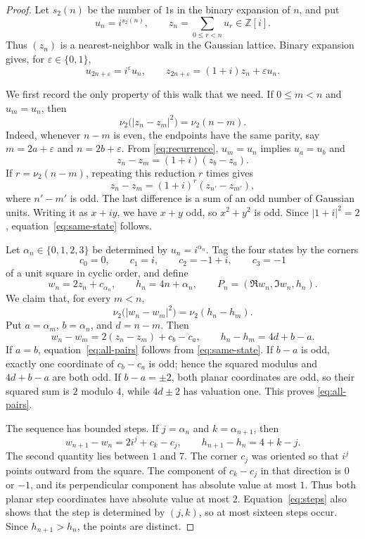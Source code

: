 \documentclass[10pt,a4paper]{amsart}
\newcommand{\Z}{\mathbb Z}
\newcommand{\vTwo}{\nu_2}
\begin{document}
\begin{proof}
Let $s_2(n)$ be the number of $1$s in the binary expansion of $n$, and put
\[
 u_n=i^{s_2(n)},\qquad z_n=\sum_{0\leq r<n}u_r\in\Z[i].
\]
Thus $(z_n)$ is a nearest-neighbor walk in the Gaussian lattice.  Binary
expansion gives, for $\varepsilon\in\{0,1\}$,
\begin{equation}\label{eq:recurrence}
 u_{2n+\varepsilon}=i^\varepsilon u_n,
 \qquad z_{2n+\varepsilon}=(1+i)z_n+\varepsilon u_n.
\end{equation}

We first record the only property of this walk that we need.  If $0\leq m<n$
and $u_m=u_n$, then
\begin{equation}\label{eq:same-state}
 \vTwo\bigl(|z_n-z_m|^2\bigr)=\vTwo(n-m).
\end{equation}
Indeed, whenever $n-m$ is even, the endpoints have the same parity, say
$m=2a+\varepsilon$ and $n=2b+\varepsilon$.  From
\eqref{eq:recurrence}, $u_m=u_n$ implies $u_a=u_b$ and
\[
 z_n-z_m=(1+i)(z_b-z_a).
\]
If $r=\vTwo(n-m)$, repeating this reduction $r$ times gives
\[
 z_n-z_m=(1+i)^r(z_{n'}-z_{m'}),
\]
where $n'-m'$ is odd.  The last difference is a sum of an odd number of
Gaussian units.  Writing it as $x+iy$, we have $x+y$ odd, so $x^2+y^2$ is
odd.  Since $|1+i|^2=2$, equation~\eqref{eq:same-state} follows.

Let $\alpha_n\in\{0,1,2,3\}$ be determined by $u_n=i^{\alpha_n}$.  Tag the
four states by the corners
\[
 c_0=0,\qquad c_1=i,\qquad c_2=-1+i,\qquad c_3=-1
\]
of a unit square in cyclic order, and define
\begin{equation}\label{eq:points}
 w_n=2z_n+c_{\alpha_n},\qquad
 h_n=4n+\alpha_n,\qquad
 P_n=(\Re w_n,\Im w_n,h_n).
\end{equation}
We claim that, for every $m<n$,
\begin{equation}\label{eq:all-pairs}
 \vTwo\bigl(|w_n-w_m|^2\bigr)=\vTwo(h_n-h_m).
\end{equation}
Put $a=\alpha_m$, $b=\alpha_n$, and $d=n-m$.  Then
\[
 w_n-w_m=2(z_n-z_m)+c_b-c_a,
 \qquad h_n-h_m=4d+b-a.
\]
If $a=b$, equation~\eqref{eq:all-pairs} follows from
\eqref{eq:same-state}.  If $b-a$ is odd, exactly one coordinate of
$c_b-c_a$ is odd; hence the squared modulus and $4d+b-a$ are both odd.  If
$b-a=\pm2$, both planar coordinates are odd, so their squared sum is $2$
modulo $4$, while $4d\pm2$ has valuation one.  This proves
\eqref{eq:all-pairs}.

The sequence has bounded steps.  If $j=\alpha_n$ and $k=\alpha_{n+1}$, then
\begin{equation}\label{eq:steps}
 w_{n+1}-w_n=2i^j+c_k-c_j,
 \qquad h_{n+1}-h_n=4+k-j.
\end{equation}
The second quantity lies between $1$ and $7$.  The corner $c_j$ was oriented
so that $i^j$ points outward from the square.  The component of $c_k-c_j$ in
that direction is $0$ or $-1$, and its perpendicular component has absolute
value at most $1$.  Thus both planar step coordinates have absolute value at
most $2$.  Equation~\eqref{eq:steps} also shows that the step is determined by
$(j,k)$, so at most sixteen steps occur.  Since $h_{n+1}>h_n$, the points are
distinct.


\end{proof}
\end{document}

